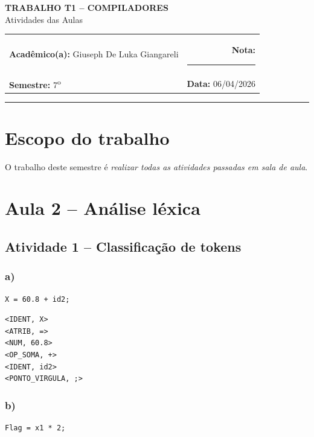 \documentclass[12pt,a4paper]{article}
\begin{document}
\begin{center}
    {\Large \textbf{TRABALHO T1 -- COMPILADORES}}\\[0.4em]
    {\normalsize Atividades das Aulas}
\end{center}

\vspace{0.2em}

\begin{tabularx}{\linewidth}{@{}X r@{}}
\textbf{Acad\^emico(a):} Giuseph De Luka Giangareli & \textbf{Nota:} \rule{2cm}{0.4pt} \\
\textbf{Semestre:} 7\textsuperscript{o} & \textbf{Data:} 06/04/2026
\end{tabularx}

\vspace{0.25em}

\hrule
\vspace{0.5em}

\section*{Escopo do trabalho}
O trabalho deste semestre é \emph{realizar todas as atividades passadas em sala de aula}. 

\section*{Aula 2 -- Análise léxica}

\subsection*{Atividade 1 -- Classificação de tokens}

\subsubsection*{a)}
\begin{lstlisting}[style=codeblock]
X = 60.8 + id2;
\end{lstlisting}

\begin{lstlisting}[style=codeblock]
<IDENT, X>
<ATRIB, =>
<NUM, 60.8>
<OP_SOMA, +>
<IDENT, id2>
<PONTO_VIRGULA, ;>
\end{lstlisting}

\subsubsection*{b)}
\begin{lstlisting}[style=codeblock]
Flag = x1 * 2;
\end{lstlisting}
\end{document}
